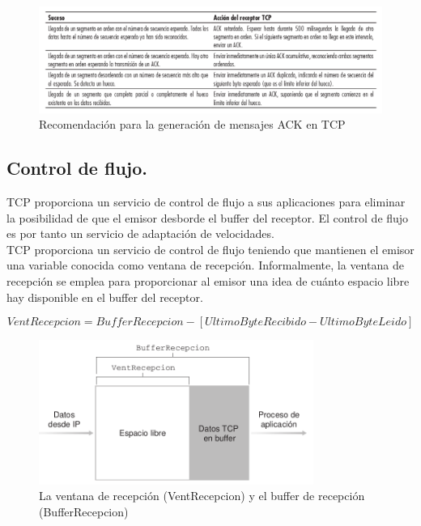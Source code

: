\documentclass[a4paper,11pt]{article}
\begin{document}
\begin{figure}
\centering
\caption{Recomendación para la generación de mensajes ACK en TCP}
\includegraphics[scale=1,width=1.2\textwidth]{tabla_ack.png}
\end{figure}

\subsection{Control de flujo.}
TCP proporciona un servicio de control de flujo a sus aplicaciones para eliminar la posibilidad de que el emisor desborde el buffer del receptor. El control de flujo es por tanto un servicio de adaptación de velocidades. \\

TCP proporciona un servicio de control de flujo teniendo que mantienen el emisor una variable conocida como ventana de recepción. Informalmente, la ventana de recepción se emplea para proporcionar al emisor una idea de cuánto espacio libre hay disponible en el buffer del receptor.

\begin{equation*}
VentRecepcion=BufferRecepcion -[UltimoByteRecibido-UltimoByteLeido]
\end{equation*}

\begin{figure}[h]
\centering
\caption{La ventana de recepción (VentRecepcion) y el buffer de recepción (BufferRecepcion)}
\includegraphics[scale=1,width=0.8\textwidth]{ventana_recepcion.png}
\end{figure}
\end{document}
